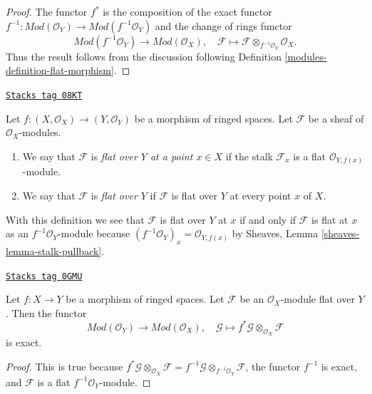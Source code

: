 \begin{proof}

The functor $f^*$ is the composition of the exact functor
$f^{-1} : \textit{Mod}(\mathcal{O}_Y) \to \textit{Mod}(f^{-1}\mathcal{O}_Y)$
and the change of rings functor
$$
\textit{Mod}(f^{-1}\mathcal{O}_Y) \to \textit{Mod}(\mathcal{O}_X), \quad
\mathcal{F} \longmapsto
\mathcal{F} \otimes_{f^{-1}\mathcal{O}_Y} \mathcal{O}_X.
$$
Thus the result follows from the discussion following
Definition \ref{modules-definition-flat-morphism}.
\end{proof}

\begin{definition}
\label{modules-definition-flat-module}
\href{https://stacks.math.columbia.edu/tag/08KT}{\texttt{Stacks tag 08KT}}

Let $f : (X, \mathcal{O}_X) \to (Y, \mathcal{O}_Y)$ be a morphism of
ringed spaces. Let $\mathcal{F}$ be a sheaf of $\mathcal{O}_X$-modules.
\begin{enumerate}
\item We say that $\mathcal{F}$ is {\it flat over $Y$ at a point $x \in X$}
if the stalk $\mathcal{F}_x$ is a flat $\mathcal{O}_{Y, f(x)}$-module.
\item We say that $\mathcal{F}$ is {\it flat over $Y$} if
$\mathcal{F}$ is flat over $Y$ at every point $x$ of $X$.
\end{enumerate}
\end{definition}

With this definition we see that $\mathcal{F}$ is flat over $Y$ at $x$
if and only if $\mathcal{F}$ is flat at $x$ as an
$f^{-1}\mathcal{O}_Y$-module because
$(f^{-1}\mathcal{O}_Y)_x = \mathcal{O}_{Y, f(x)}$ by
Sheaves, Lemma \ref{sheaves-lemma-stalk-pullback}.

\begin{lemma}
\label{modules-lemma-pullback-tensor-flat-module}
\href{https://stacks.math.columbia.edu/tag/0GMU}{\texttt{Stacks tag 0GMU}}

Let $f : X \to Y$ be a morphism of ringed spaces. Let $\mathcal{F}$
be an $\mathcal{O}_X$-module flat over $Y$. Then the functor
$$
\textit{Mod}(\mathcal{O}_Y) \to \textit{Mod}(\mathcal{O}_X),\quad
\mathcal{G} \longmapsto f^*\mathcal{G} \otimes_{\mathcal{O}_X} \mathcal{F}
$$
is exact.
\end{lemma}

\begin{proof}
This is true because
$f^*\mathcal{G} \otimes_{\mathcal{O}_X} \mathcal{F} =
f^{-1}\mathcal{G} \otimes_{f^{-1}\mathcal{O}_Y} \mathcal{F}$,
the functor $f^{-1}$ is exact, and $\mathcal{F}$ is a flat
$f^{-1}\mathcal{O}_Y$-module.
\end{proof}

